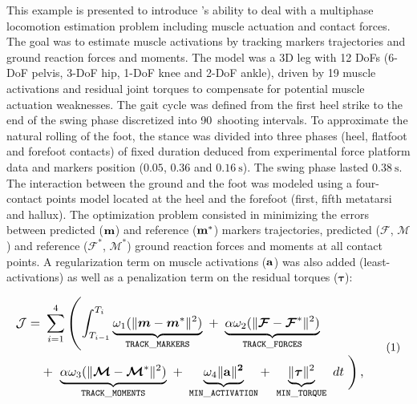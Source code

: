 This example is presented to introduce \Bioptim's ability to deal with a multiphase locomotion estimation problem including muscle actuation and contact forces.
The goal was to estimate muscle activations by tracking markers trajectories and ground reaction forces and moments. 
The model was a 3D leg with 12 DoFs (6-DoF pelvis, 3-DoF hip, 1-DoF knee and 2-DoF ankle), driven by 19 muscle activations and residual joint torques to compensate for potential muscle actuation weaknesses. 
The gait cycle was defined from the first heel strike to the end of the swing phase discretized into 90~shooting intervals. 
To approximate the natural rolling of the foot, the stance was divided into three phases (heel, flatfoot and forefoot contacts) of fixed duration deduced from experimental force platform data and markers position ($0.05$, $0.36$ and $\SI{0.16}{\second}$).
The swing phase lasted $\SI{0.38}{\second}$. 
The interaction between the ground and the foot was modeled using a four-contact points model located at the heel and the forefoot (first, fifth metatarsi and hallux).
The optimization problem consisted in minimizing the errors between predicted ($\bf{m}$) and reference ($\bf{m}^*$) markers trajectories, predicted ($\bm{\mathcal{F}}$, $\bm{\mathcal{M}}$) and reference ($\bm{\mathcal{F}^*}$, $\bm{\mathcal{M}}^*$) ground reaction forces and moments at all contact points.
A regularization term on muscle activations ($\bf{a}$) was also added (least-activations) as well as a penalization term on the residual torques ($\boldsymbol{\tau}$):

\[ 
\resizebox{0.9\columnwidth}{!}{$ 
\begin{aligned}
\mathcal{J} = &~\sum_{i=1}^4\left(\int_{T_{i-1}}^{T_i}\underbrace{\omega_1(\|\bm{m} - \bm{m}^*\|^{2})}_{\mathtt{TRACK\_MARKERS}}~ 
+ ~ \underbrace{\alpha\omega_2(\|\bm{\mathcal{F}} - \bm{\mathcal{F}}^*\|^{2})}_{\mathtt{TRACK\_FORCES}}\right.\\
&+ ~ \underbrace{\alpha\omega_3(\|\bm{\mathcal{M}} - \bm{\mathcal{M}}^*\|^{2})}_{\mathtt{TRACK\_MOMENTS}}~
+ ~ \underbrace{\omega_4\|\bf{a}\|^2}_{\mathtt{MIN\_ACTIVATION}}
+ ~ \underbrace{\|\boldsymbol{\tau}\|^2}_{\mathtt{MIN\_TORQUE}}~dt\left.\vphantom{\int_{T_{i-1}}^{T_i}}\right), 
\end{aligned}  
$}  
\addtag  
\label{eq:ocp_walk}  
\]

